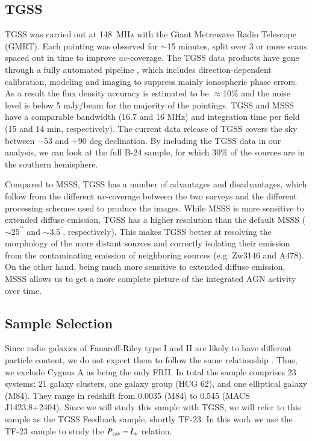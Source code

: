 \documentclass{aa}  %
\begin{document}
\subsection{TGSS}
\label{lab:TGSS}

TGSS was carried out at 148~MHz with the Giant Metrewave Radio Telescope (GMRT). 
Each pointing was observed for $\sim$15 minutes, split over 3 or more scans spaced out in time to improve $uv$-coverage. 
The TGSS data products have gone through a fully automated pipeline \citep{Intema2009, Intema2014}, which includes direction-dependent calibration, modeling and imaging to suppress mainly ionospheric phase errors.
As a result the flux density accuracy is estimated to be $\approx$10\% and the noise level is below 5 mJy/beam for the majority of the pointings.
TGSS and MSSS have a comparable bandwidth (16.7 and 16 MHz) and integration time per field (15 and 14 min, respectively).
The current data release of TGSS covers the sky between $-53$ and $+90$ deg declination. 
By including the TGSS data in our analysis, we can look at the full B-24 sample, for which 30\% of the sources are in the southern hemisphere.

Compared to MSSS, TGSS has a number of advantages and disadvantages, which follow from the different $uv$-coverage between the two surveys and the different processing schemes used to produce the images.
While MSSS is more sensitive to extended diffuse emission, TGSS has a higher resolution than the default MSSS ($\sim25^{\prime\prime}$ and $\sim3.5^{\prime}$, respectively).
This makes TGSS better at resolving the morphology of the more distant sources and correctly isolating their emission from the contaminating emission of neighboring sources (e.g. Zw3146 and A478).
On the other hand, being much more sensitive to extended diffuse emission, MSSS allows us to get a more complete picture of the integrated AGN activity over time.







\subsection{Sample Selection}
\label{lab:subsamples}


Since radio galaxies of Fanaroff-Riley type I and II \citep[FRI and FRII;][]{Fanaroff1974} are likely to have different particle content, we do not expect them to follow the same relationship \citep{GodfreyShabala2013}. 
Thus, we exclude Cygnus A \citep[e.g.][]{McKean2016} as being the only FRII.
In total the sample comprises 23 systems: 21 galaxy clusters, one galaxy group (HCG 62), and one elliptical galaxy (M84). They range in redshift from 0.0035 (M84) to 0.545 (MACS J1423.8+2404). 
Since we will study this sample with TGSS, we will refer to this sample as the TGSS Feedback sample, shortly TF-23.
In this work we use the TF-23 sample to study the $P_{\rm cav} - L_\nu$ relation.
\end{document}
